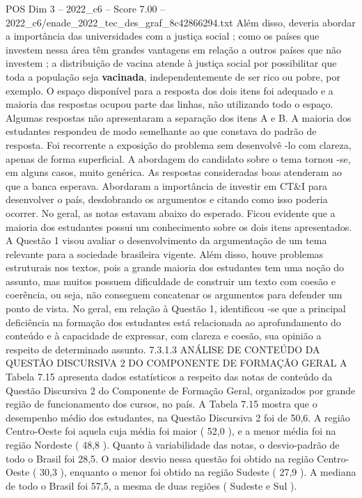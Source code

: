 \begin{textsample}{POS Dim 3 – 2022\_c6 – Score 7.00 – 2022\_c6/enade\_2022\_tec\_des\_graf\_8c42866294.txt}
Além disso, deveria abordar a importância das universidades com a justiça social ; como os países que investem nessa área têm grandes vantagens em relação a outros países que não investem ; a distribuição de vacina atende à justiça social por possibilitar que toda a população seja \textbf{vacinada}, independentemente de ser rico ou pobre, por exemplo.
O espaço disponível para a resposta dos dois itens foi adequado e a maioria das respostas ocupou parte das linhas, não utilizando todo o espaço.
Algumas respostas não apresentaram a separação dos itens A e B.
A maioria dos estudantes respondeu de modo semelhante ao que constava do padrão de resposta.
Foi recorrente a exposição do problema sem desenvolvê -lo com clareza, apenas de forma superficial.
A abordagem do candidato sobre o tema tornou -se, em alguns casos, muito genérica.
As respostas consideradas boas atenderam ao que a banca esperava.
Abordaram a importância de investir em CT\&I para desenvolver o país, desdobrando os argumentos e citando como isso poderia ocorrer.
No geral, as notas estavam abaixo do esperado.
Ficou evidente que a maioria dos estudantes possui um conhecimento sobre os dois itens apresentados.
A Questão 1 visou avaliar o desenvolvimento da argumentação de um tema relevante para a sociedade brasileira vigente.
Além disso, houve problemas estruturais nos textos, pois a grande maioria dos estudantes tem uma noção do assunto, mas muitos possuem dificuldade de construir um texto com coesão e coerência, ou seja, não conseguem concatenar os argumentos para defender um ponto de vista.
No geral, em relação à Questão 1, identificou -se que a principal deficiência na formação dos estudantes está relacionada ao aprofundamento do conteúdo e à capacidade de expressar, com clareza e coesão, sua opinião a respeito de determinado assunto. 7.3.1.3 ANÁLISE DE CONTEÚDO DA QUESTÃO DISCURSIVA 2 DO COMPONENTE DE FORMAÇÃO GERAL A Tabela 7.15 apresenta dados estatísticos a respeito das notas de conteúdo da Questão Discursiva 2 do Componente de Formação Geral, organizados por grande região de funcionamento dos cursos, no país.
A Tabela 7.15 mostra que o desempenho médio dos estudantes, na Questão Discursiva 2 foi de 50,6.
A região Centro-Oeste foi aquela cuja média foi maior ( 52,0 ), e a menor média foi na região Nordeste ( 48,8 ).
Quanto à variabilidade das notas, o desvio-padrão de todo o Brasil foi 28,5.
O maior desvio nessa questão foi obtido na região Centro-Oeste ( 30,3 ), enquanto o menor foi obtido na região Sudeste ( 27,9 ).
A mediana de todo o Brasil foi 57,5, a mesma de duas regiões ( Sudeste e Sul ).

\end{textsample}
